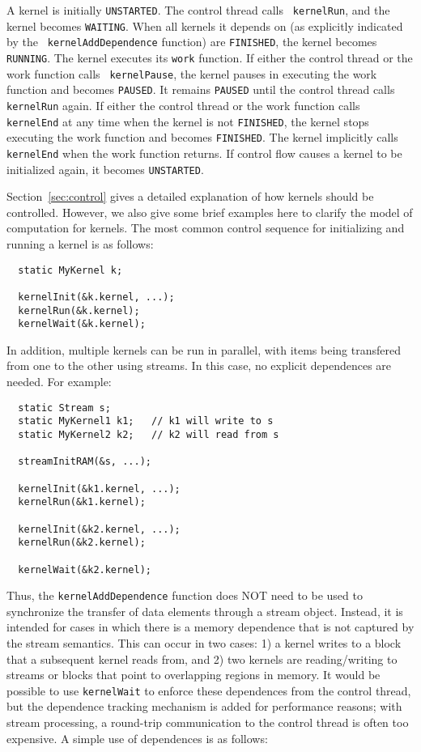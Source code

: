 A kernel is initially {\tt UNSTARTED}.  The control thread calls {\tt
kernelRun}, and the kernel becomes {\tt WAITING}.  When all kernels
it depends on (as explicitly indicated by the {\tt
kernelAddDependence} function) are {\tt FINISHED}, the kernel becomes
{\tt RUNNING}. The kernel executes its {\tt work} function.  If
either the control thread or the work function calls {\tt
kernelPause}, the kernel pauses in executing the work function and
becomes {\tt PAUSED}. It remains {\tt PAUSED} until the control thread
calls {\tt kernelRun} again. If either the control thread or the
work function calls {\tt kernelEnd} at any time when the kernel is
not {\tt FINISHED}, the kernel stops executing the work function and
becomes {\tt FINISHED}. The kernel implicitly calls {\tt kernelEnd}
when the work function returns. If control flow causes a kernel to be
initialized again, it becomes {\tt UNSTARTED}.

Section~\ref{sec:control} gives a detailed explanation of how kernels
should be controlled.  However, we also give some brief examples here
to clarify the model of computation for kernels.  The most common
control sequence for initializing and running a kernel is as follows:

{\small
\begin{verbatim}
  static MyKernel k;

  kernelInit(&k.kernel, ...);
  kernelRun(&k.kernel);
  kernelWait(&k.kernel);
\end{verbatim}}

In addition, multiple kernels can be run in parallel, with items being
transfered from one to the other using streams.  In this case, no
explicit dependences are needed.  For example:

{\small
\begin{verbatim}
  static Stream s;
  static MyKernel1 k1;   // k1 will write to s
  static MyKernel2 k2;   // k2 will read from s

  streamInitRAM(&s, ...);

  kernelInit(&k1.kernel, ...);  
  kernelRun(&k1.kernel);

  kernelInit(&k2.kernel, ...);
  kernelRun(&k2.kernel);

  kernelWait(&k2.kernel);
\end{verbatim}}

Thus, the {\tt kernelAddDependence} function does NOT need to be used
to synchronize the transfer of data elements through a stream object.
Instead, it is intended for cases in which there is a memory
dependence that is not captured by the stream semantics.  This can
occur in two cases: 1) a kernel writes to a block that a subsequent
kernel reads from, and 2) two kernels are reading/writing to streams
or blocks that point to overlapping regions in memory.  It would be
possible to use {\tt kernelWait} to enforce these dependences from the
control thread, but the dependence tracking mechanism is added for
performance reasons; with stream processing, a round-trip
communication to the control thread is often too expensive.  A simple
use of dependences is as follows:

